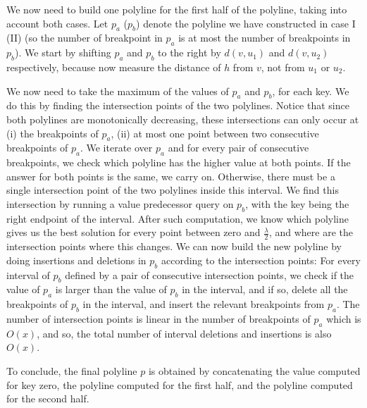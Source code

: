 \documentclass[a4paper,UKenglish]{lipics-v2016}
\theoremstyle{plain}
\begin{document}
\medskip {}
We now need to build one polyline for the first half of the polyline, taking into account both cases. Let $p_a$ ($p_b$) denote the polyline we have constructed in case I (II) (so the number of breakpoint in $p_a$ is at most the number of breakpoints in $p_b$). We start by shifting $p_a$ and $p_b$ to the right by $d(v,u_1)$ and $d(v,u_2)$ respectively, because now measure the distance of $h$ from $v$, not from $u_1$ or $u_2$. 

We now need to take the maximum of the values of $p_a$ and $p_b$, for each key. We do this by finding the intersection points of the two polylines. Notice that since both polylines are monotonically decreasing, these intersections can only occur at (i) the breakpoints of $p_a$, (ii) at most one point between two consecutive breakpoints of $p_a$. We iterate over $p_a$ and for every pair of consecutive breakpoints, we check which polyline has the higher value at both points. If the answer for both points is the same, we carry on. Otherwise, there must be a single intersection point of the two polylines inside this interval. We find this intersection by running a value predecessor query on $p_b$, with the key being the right endpoint of the interval. After such computation, we know which polyline gives us the best solution for every point between zero and $\frac{\lambda}{2}$, and where are the intersection points where this changes. We can now build the new polyline by doing insertions and deletions in $p_b$ according to the intersection points: For every interval of $p_b$ defined by a pair of consecutive intersection points, we check if the value of $p_a$ is larger than the value of $p_b$ in the interval, and if so, delete all the breakpoints of $p_b$ in the interval, and insert the relevant breakpoints from $p_a$. The number of intersection points is linear in the number of breakpoints of $p_a$ which is $O(x)$, and so, the total number of interval deletions and insertions is also $O(x)$.

To conclude, the final polyline $p$ is obtained by concatenating the value computed for key zero, the polyline computed for the first half, and the polyline computed for the second half. 
\end{document}
